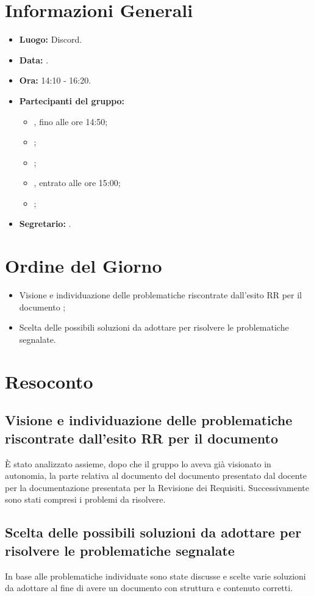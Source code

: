 \section{Informazioni Generali}
\begin{itemize}
	\item \textbf{Luogo:} Discord.
	\item \textbf{Data:} \Data.
	\item \textbf{Ora:} 14:10 - 16:20.
	\item \textbf{Partecipanti del gruppo:}
	\begin{itemize}
		\item \AT{}, fino alle ore 14:50; 
		\item \CE{};
		\item \DF{}; 
		\item \LD{}, entrato alle ore 15:00;
		\item \PF{};
	\end{itemize} 
	\item \textbf{Segretario:} \PF{}.
\end{itemize}

\section{Ordine del Giorno}
\begin{itemize}
	\item Visione e individuazione delle problematiche riscontrate dall'esito RR per il documento ;
	\item Scelta delle possibili soluzioni da adottare per risolvere le problematiche segnalate.
\end{itemize}

\section{Resoconto}

\subsection{Visione e individuazione delle problematiche riscontrate dall'esito RR per il documento }
È stato analizzato assieme, dopo che il gruppo lo aveva già visionato in autonomia, la parte relativa al documento  del documento presentato dal docente per la documentazione presentata per la Revisione dei Requisiti. Successivamente sono stati compresi i problemi da risolvere.

\subsection{Scelta delle possibili soluzioni da adottare per risolvere le problematiche segnalate}
In base alle problematiche individuate sono state discusse e scelte varie soluzioni da adottare al fine di avere un documento con struttura e contenuto corretti.

\clearpage